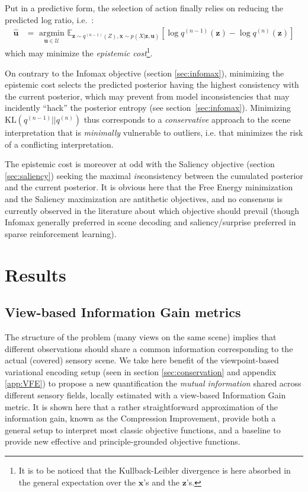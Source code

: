 \documentclass[12pt,twoside,openright]{article}
\begin{document}
Put in a predictive form, the selection of action finally relies on reducing the predicted log ratio, i.e.~:
\begin{align}
\hat{\boldsymbol{u}} &= \underset{\boldsymbol{u} \in \mathcal{U}}{\text{ argmin }} \mathbb{E}_{\boldsymbol{z} \sim q^{(n-1)}(Z), \boldsymbol{x} \sim p(X|\boldsymbol{z}, \boldsymbol{u})}\left[\log q^{(n-1)}(\boldsymbol{z}) - \log q^{(n)}(\boldsymbol{z})\right]
\end{align}
which may {\color{Purple} minimize the \emph{epistemic cost}}\footnote{It is to be noticed  that the  Kullback-Leibler divergence is here absorbed in the general expectation over the $\boldsymbol{x}$'s and the $\boldsymbol{z}$'s.}.

On contrary to the Infomax objective (section \ref{sec:infomax}), {\color{Purple}minimizing the  epistemic cost} selects the predicted posterior having the highest consistency with the current posterior, which may prevent from model {\color{Purple} inconsistencies} that may incidently ``hack'' the posterior entropy (see section~\ref{sec:infomax}).
Minimizing $\text{KL}(q^{(n-1)}||q^{(n)})$ thus corresponds to a \emph{conservative} approach to the scene interpretation
that is \emph{minimally} vulnerable to outliers, i.e. that minimizes the risk of a {\color{Purple} conflicting} interpretation. 

The {\color{Purple} epistemic cost} is moreover at odd with the Saliency objective (section \ref{sec:saliency}) seeking the maximal \emph{in}consistency between the cumulated posterior and the current posterior.
It is obvious here that the Free Energy minimization and the Saliency maximization are antithetic objectives, and no consensus is currently observed in the literature about which objective should prevail (though Infomax generally preferred in scene decoding and saliency/surprise preferred in sparse reinforcement learning).


\section{Results} \label{sec:results}



\subsection{View-based Information Gain metrics}\label{sec:info-gain}
The structure of the problem (many views on the same scene) implies that {\color{Purple} different observations} should share a common information corresponding to the actual (covered) sensory scene.
We take here benefit of the {\color{Purple} viewpoint-based} variational encoding setup
{\color{Purple} (seen in section \ref{sec:conservation} and appendix \ref{app:VFE}) to propose a new quantification the \emph{mutual information} shared across different sensory fields, locally estimated with a view-based Information Gain metric. It is shown here that a rather straightforward approximation of the information gain,
	known as the Compression Improvement, provide both a general setup to interpret most classic objective functions, and a baseline to provide new effective and  principle-grounded objective functions.}
\end{document}
